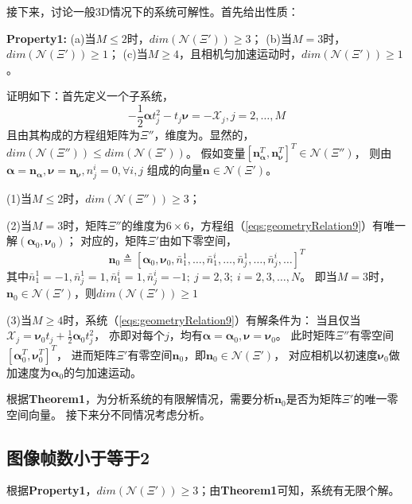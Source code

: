 \documentclass{article}
\begin{document}
\newpage
接下来，讨论一般3D情况下的系统可解性。首先给出性质：
\par
\textbf{Property1: } (a)当$M\leqslant 2$时，$dim(\mathcal{N}(\Xi'))\geqslant 3$；
(b)当$M=3$时，$dim(\mathcal{N}(\Xi'))\geqslant 1$；
(c)当$M\geqslant 4$，且相机匀加速运动时，$dim(\mathcal{N}(\Xi'))\geqslant 1$。
\par
证明如下：首先定义一个子系统，
\begin{equation}\label{eqs:geometryRelation9}
    -\frac{1}{2}\mathbf{\alpha}t_j^2-t_j\mathbf{\nu}=-\mathcal{X}_j, j=2,\dots,M
\end{equation}
且由其构成的方程组矩阵为$\Xi''$，维度为{\color{red}{$3(M-1)\times 6$}}。显然的，$dim(\mathcal{N}(\Xi''))\leqslant dim(\mathcal{N}(\Xi'))$。
假如变量$\left[\textbf{n}_\mathbf{\alpha}^T,\textbf{n}_\mathbf{\nu}^T\right]^T\in\mathcal{N}(\Xi'')$，
则由$\mathbf{\alpha}=\textbf{n}_{\mathbf{\alpha}},\mathbf{\nu}=\textbf{n}_{\mathbf{\nu}},n_j^i=0, \forall i,j$
组成的向量$\textbf{n}\in \mathcal{N}(\Xi')$。
\par
(1)当$M\leqslant 2$时，$dim(\mathcal{N}(\Xi''))\geqslant 3$；
\par
(2)当$M=3$时，矩阵$\Xi''$的维度为$6\times 6$，方程组（\ref{eqs:geometryRelation9}）有唯一解$(\mathbf{\alpha}_0,\mathbf{\nu}_0)$；
对应的，矩阵$\Xi'$由如下零空间，
\begin{equation}\label{eqs:zeroSpace}
    \textbf{n}_0\triangleq \left[\mathbf{\alpha}_0,\mathbf{\nu}_0,\bar{n}_1^1,\dots,\bar{n}_1^i,
    \dots,\bar{n}_j^1,\dots,\bar{n}_j^i,\dots\right]^T
\end{equation}
其中$\bar{n}_1^1=-1,\bar{n}_j^1=1,\bar{n}_1^i=1,\bar{n}_j^i=-1;\ j=2,3;\ i=2,3,\dots,N$。
即当$M=3$时，$\textbf{n}_0\in \mathcal{N}(\Xi')$，则$dim(\mathcal{N}(\Xi'))\geqslant 1$
\par
(3)当$M\geqslant 4$时，系统（\ref{eqs:geometryRelation9}）有解条件为：
当且仅当$\mathcal{X}_j=\mathbf{\nu}_{0}t_{j}+\frac{1}{2}\mathbf{\alpha}_0t_j^2$，
亦即对每个$j$，均有$\mathbf{\alpha}=\mathbf{\alpha}_0, \mathbf{\nu}=\mathbf{\nu}_0$。
此时矩阵$\Xi''$有零空间$\left[\mathbf{\alpha}_0^T,\mathbf{\nu}_0^T\right]^T$，
进而矩阵$\Xi'$有零空间$\textbf{n}_0$，即$\textbf{n}_0\in \mathcal{N}(\Xi')$，
对应相机以初速度$\mathbf{\nu}_0$做加速度为$\mathbf{\alpha}_0$的匀加速运动。

\par
根据\textbf{Theorem1}，为分析系统的有限解情况，需要分析$\textbf{n}_0$是否为矩阵$\Xi'$的唯一零空间向量。
接下来分不同情况考虑分析。

\subsection{图像帧数小于等于2}
根据\textbf{Property1}，$dim(\mathcal{N}(\Xi'))\geqslant 3$；由\textbf{Theorem1}可知，系统有无限个解。
\end{document}
